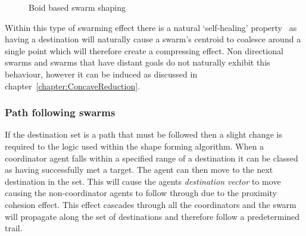 \begin{figure}[H]
\centering
{}
\caption{Boid based swarm shaping}
\label{methods:SwarmShape}
\end{figure}

Within this type of swarming effect there is a natural `self-healing' property~\cite{RS:08, KY:10} as having a destination will naturally cause a swarm's centroid to coalesce around a single point which will therefore create a compressing effect. Non directional swarms and swarms that have distant goals do not naturally exhibit this behaviour, however it can be induced as discussed in chapter~\ref{chapter:ConcaveReduction}. 

\subsubsection{Path following swarms}\label{sec:DirectionalShape4}
If the destination set is a path that must be followed then a slight change is required to the logic used within the shape forming algorithm. When a coordinator agent falls within a specified range of a destination it can be classed as having successfully met a target. The agent can then move to the next destination in the set. This will cause the agents \textit{destination vector} to move causing the non-coordinator agents to follow through due to the proximity cohesion effect. This effect cascades through all the coordinators and the swarm will propagate along the set of destinations and therefore follow a predetermined trail.

